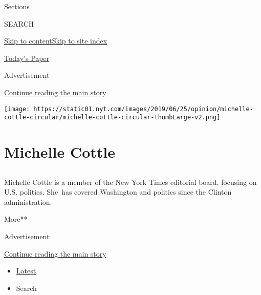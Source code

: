 Sections

SEARCH

\protect\hyperlink{site-content}{Skip to
content}\protect\hyperlink{site-index}{Skip to site index}

\href{https://myaccount.nytimes.com/auth/login?response_type=cookie\&client_id=vi}{}

\href{https://www.nytimes.com/section/todayspaper}{Today's Paper}

Advertisement

\protect\hyperlink{after-top}{Continue reading the main story}

\texttt{[image: https://static01.nyt.com/images/2019/06/25/opinion/michelle-cottle-circular/michelle-cottle-circular-thumbLarge-v2.png]}

\hypertarget{michelle-cottle}{%
\section{Michelle Cottle}\label{michelle-cottle}}

\subsection{}

Michelle Cottle is a member of the New York Times editorial board,
focusing on U.S. politics. She~has covered Washington and politics since
the Clinton administration.

More**

Advertisement

\protect\hyperlink{after-mid1}{Continue reading the main story}

\begin{itemize}
\tightlist
\item
  \protect\hyperlink{stream-panel}{Latest}
\item
  Search
\end{itemize}

